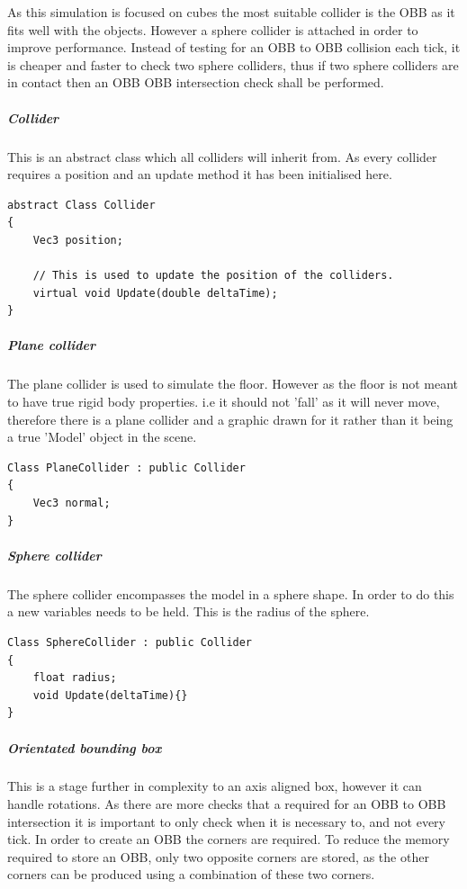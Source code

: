 \documentclass[conference,backref=page]{acmsiggraph}
\begin{document}
As this simulation is focused on cubes the most suitable collider is the OBB as it fits well with the objects. However a sphere collider is attached in order to improve performance. Instead of testing for an OBB to OBB collision each tick, it is cheaper and faster to check two sphere colliders, thus if two sphere colliders are in contact then an OBB OBB intersection check shall be performed. 

\subparagraph{Collider} \hfill

This is an abstract class which all colliders will inherit from. As every collider requires a position and an update method it has been initialised here.

\begin{lstlisting}
abstract Class Collider
{
	Vec3 position;
	
	// This is used to update the position of the colliders.
	virtual void Update(double deltaTime); 
}
\end{lstlisting}

\subparagraph{Plane collider} \hfill

The plane collider is used to simulate the floor. However as the floor is not meant to have true rigid body properties. i.e it should not 'fall' as it will never move, therefore there is a plane collider and a graphic drawn for it rather than it being a true 'Model' object in the scene.

\begin{lstlisting}
Class PlaneCollider : public Collider
{
	Vec3 normal;
}
\end{lstlisting}

\subparagraph{Sphere collider}  \hfill 

The sphere collider encompasses the model in a sphere shape. In order to do this a new variables needs to be held. This is the radius of the sphere.
\begin{lstlisting}
Class SphereCollider : public Collider
{
	float radius;
	void Update(deltaTime){}
}
\end{lstlisting}

\subparagraph{Orientated bounding box}\hfill 

This is a stage further in complexity to an axis aligned box, however it can handle rotations. As there are more checks that a required for an OBB to OBB intersection it is important to only check when it is necessary to, and not every tick. In order to create an OBB the corners are required. To reduce the memory required to store an OBB, only two opposite corners are stored, as the other corners can be produced using a combination of these two corners.
\end{document}
